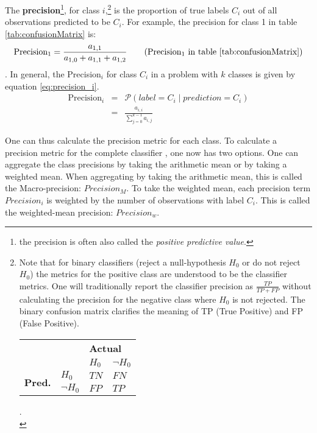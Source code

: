 The \textbf{precision}\footnote{the precision is often also called the \textit{positive predictive value}.}, for class $i$,\footnote{
    Note that for binary classifiers (reject a null-hypothesis $H_0$ or do not reject $H_0$) the metrics for the positive class are understood to be the classifier metrics. 
    One will traditionally report the classifier precision as $\frac{TP}{TP+FP}$ without calculating the precision for the negative class where $H_0$ is not rejected.
    The binary confusion matrix clarifies the meaning of TP (True Positive) and FP (False Positive).
    \begin{tabular}{clll}
        \multicolumn{1}{l}{}                &                        & \multicolumn{2}{l}{\textbf{Actual}}           \\
        \multicolumn{1}{l}{}                &                        & $H_0$   & $\neg H_0$                         \\ \cline{3-4} 
        \multirow{2}{*}{\textbf{Pred.}}   & \multicolumn{1}{l|}{$H_0$} & $TN$ & \multicolumn{1}{l|}{$FN$} \\
                                            & \multicolumn{1}{l|}{$\neg H_0$} & $FP$  & \multicolumn{1}{l|}{$TP$ } \\ \hline
        \end{tabular}.\\
} is the proportion of true labels $C_i$ out of all observations predicted to be $C_i$. 
For example, the precision for class 1 in table \ref{tab:confusionMatrix} is:
\begin{equation}
    \text{Precision}_1 = \frac{a_{1,1}}{a_{1,0} + a_{1,1} + a_{1, 2}} \tag{Precision$_1$ in table \ref{tab:confusionMatrix}}
\end{equation}.
In general, the Precision$_i$ for class $C_i$ in a problem with $k$ classes is given by equation \ref{eq:precision_i}.
\begin{eqnarray}
    \text{Precision}_i &=& \mathcal{P} \left( label = C_i \mid prediction = C_i \right) \\
    &=& \frac{a_{i, i}}{\sum_{j=0}^{k-1} a_{i, j}} \label{eq:precision_i}
\end{eqnarray}

One can thus calculate the precision metric for each class. 
To calculate a precision metric for the complete classifier
, one now has two options.
One can aggregate the class precisions by taking the arithmetic mean or by taking a weighted mean.
When aggregating by taking the arithmetic mean, this is called the Macro-precision: $Precision_M$.
To take the weighted mean, each precision term $Precision_i$ is weighted by the number of observations with label $C_i$. 
This is called the weighted-mean precision: $Precision_w$.

